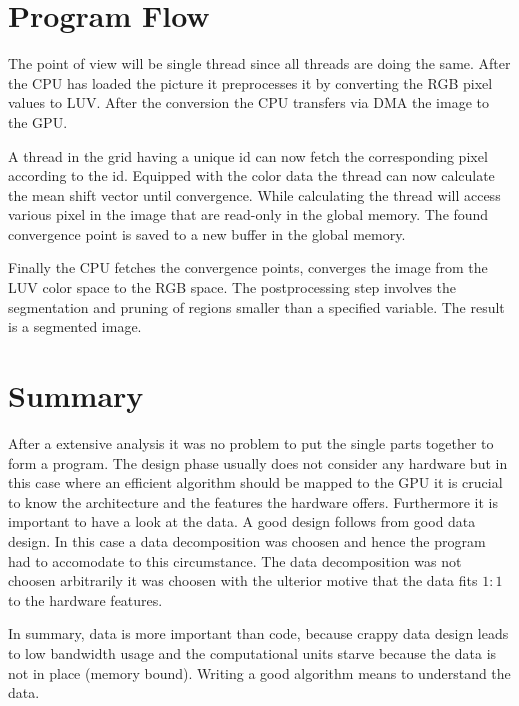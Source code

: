 \section{Program Flow} %
\label{sec:program_flow}

The point of view will be single thread since all threads are doing the same. 
After the \gls{CPU} has loaded the picture it preprocesses it by converting
the \gls{RGB} pixel values to \gls{LUV}. After the conversion the \gls{CPU}
transfers via \gls{DMA} the image to the \gls{GPU}.

A thread in the grid having a unique id can now fetch the corresponding pixel
according to the id. Equipped with the color data the thread can now calculate
the mean shift vector until convergence. While calculating the thread will 
access various pixel in the image that are read-only in the global memory. The 
found convergence point is saved to a new buffer in the global memory.

Finally the \gls{CPU} fetches the convergence points, converges the image from 
the \gls{LUV} color space to the \gls{RGB} space. The postprocessing step
involves the segmentation and pruning of regions smaller than a specified 
variable. The result is a segmented image. 


\section{Summary} %
\label{sec:design_summary}
After a extensive analysis it was no problem to put the single parts together
to form a program. The design phase usually does not consider any hardware but
in this case where an efficient algorithm should be mapped to the \gls{GPU} it
is crucial to know the architecture and the features the hardware offers. 
Furthermore it is important to have a look at the data. A good design follows
from good data design. In this case a data decomposition was choosen and hence the 
program had to accomodate to this circumstance. The data decomposition was not 
choosen arbitrarily it was choosen with the ulterior motive that the data fits
$1:1$ to the hardware features. 

In summary, data is more important than code, because crappy data design leads
to low bandwidth usage and the computational units starve because the data
is not in place (memory bound). Writing a good algorithm means to understand the 
data. 








